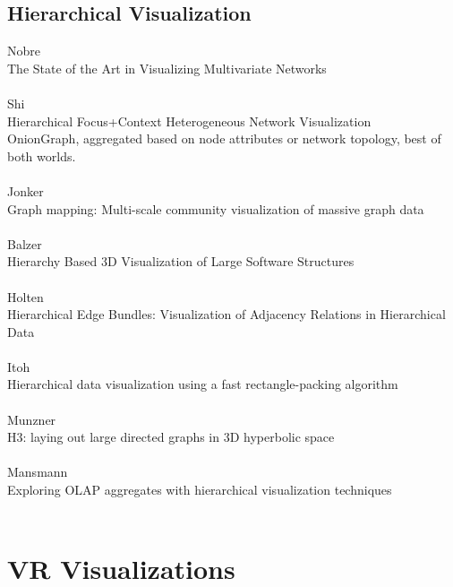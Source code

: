 \subsection{Hierarchical Visualization}
Nobre\\
The State of the Art in Visualizing Multivariate Networks\\
\\
Shi\\
Hierarchical Focus+Context Heterogeneous Network Visualization\\
OnionGraph, aggregated based on node attributes or network topology,
best of both worlds.\\
\\
Jonker\\
Graph mapping: Multi-scale community visualization of massive graph data\\
\\
Balzer\\
Hierarchy Based 3D Visualization of Large Software Structures\\
\\
Holten\\
Hierarchical Edge Bundles: Visualization of Adjacency Relations in Hierarchical Data\\
\\
Itoh\\
Hierarchical data visualization using a fast rectangle-packing algorithm\\
\\
Munzner\\
H3: laying out large directed graphs in 3D hyperbolic space\\
\\
Mansmann\\
Exploring OLAP aggregates with hierarchical visualization techniques\\
\\

\section{VR Visualizations}

